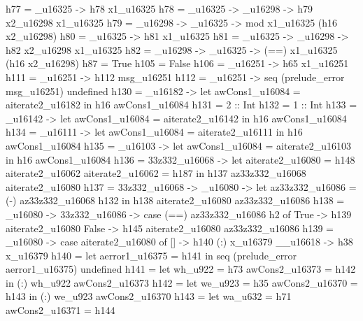          h77 = _u16325 -> h78 x1_u16325
         h78 = _u16325 -> _u16298 -> h79 x2_u16298 x1_u16325
         h79 = _u16298 -> _u16325 -> mod x1_u16325 (h16 x2_u16298)
         h80 = _u16325 -> h81 x1_u16325
         h81 = _u16325 -> _u16298 -> h82 x2_u16298 x1_u16325
         h82 = _u16298 -> _u16325 -> (==) x1_u16325 (h16 x2_u16298)
         h87 = True
         h105 = False
         h106 = _u16251 -> h65 x1_u16251
         h111 = \msg_u16251 -> h112 msg_u16251
         h112 = \msg_u16251 -> seq (prelude_error msg_u16251) undefined
         h130 = _u16182 -> let awCons1_u16084 = aiterate2_u16182
                                     in h16 awCons1_u16084
         h131 = 2 :: Int
         h132 = 1 :: Int
         h133 = _u16142 -> let awCons1_u16084 = aiterate2_u16142
                                     in h16 awCons1_u16084
         h134 = _u16111 -> let awCons1_u16084 = aiterate2_u16111
                                     in h16 awCons1_u16084
         h135 = _u16103 -> let awCons1_u16084 = aiterate2_u16103
                                     in h16 awCons1_u16084
         h136 = \az33z332_u16068 -> let
                                      aiterate2_u16080 = h148 aiterate2_u16062
                                      aiterate2_u16062 = h187
                                    in h137 az33z332_u16068 aiterate2_u16080
         h137 = \az33z332_u16068 -> _u16080 -> let
                                                           az33z332_u16086 = (-) az33z332_u16068 h132
                                                         in h138 aiterate2_u16080 az33z332_u16086
         h138 = _u16080 -> \az33z332_u16086 -> case (==) az33z332_u16086 h2 of
                                                           True -> h139 aiterate2_u16080
                                                           False -> h145 aiterate2_u16080 az33z332_u16086
         h139 = _u16080 -> case aiterate2_u16080 of
                                       [] -> h140
                                       (:) x_u16379 __u16618 -> h38 x_u16379
         h140 = let aerror1_u16375 = h141
                in seq (prelude_error aerror1_u16375) undefined
         h141 = let
                  wh_u922 = h73
                  awCons2_u16373 = h142
                in (:) wh_u922 awCons2_u16373
         h142 = let
                  we_u923 = h35
                  awCons2_u16370 = h143
                in (:) we_u923 awCons2_u16370
         h143 = let
                  wa_u632 = h71
                  awCons2_u16371 = h144

